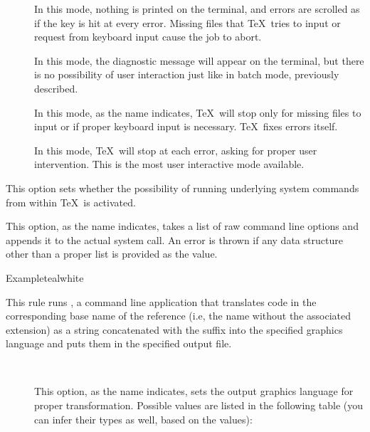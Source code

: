 \begin{description}
\begin{description}
\begin{description}
\item[] In this mode, nothing is printed on the terminal, and errors are scrolled as if the  key is hit at every error. Missing files that \TeX\ tries to input or request from keyboard input cause the job to abort.

\item[] In this mode, the diagnostic message will appear on the terminal, but there is no possibility of user interaction just like in batch mode, previously described.

\item[] In this mode, as the name indicates, \TeX\ will stop only for missing files to input or if proper keyboard input is necessary. \TeX\ fixes errors itself.

\item[] In this mode, \TeX\ will stop at each error, asking for proper user intervention. This is the most user interactive mode available.
\end{description}

\item[\rpsbox{shell}] This option sets whether the possibility of running underlying system commands from within \TeX\ is activated.

\item[\abox{options}] This option, as the name indicates, takes a list of raw command line options and appends it to the actual system call. An error is thrown if any data structure other than a proper list is provided as the value.
\end{description}

\begin{codebox}{Example}{teal}{\icnote}{white}
\end{codebox}

\item[\rulebox{fig2dev}]
This rule runs , a command line application that translates  code in the corresponding base name of the  reference (i.e, the name without the associated extension) as a string concatenated with the  suffix into the specified graphics language and puts them in the specified output file.

\begin{description}
\item[~\rqbox] This option, as the name indicates, sets the output graphics language for proper transformation. Possible values are listed in the following table (you can infer their types as well, based on the values):


\end{description}
\end{description}
